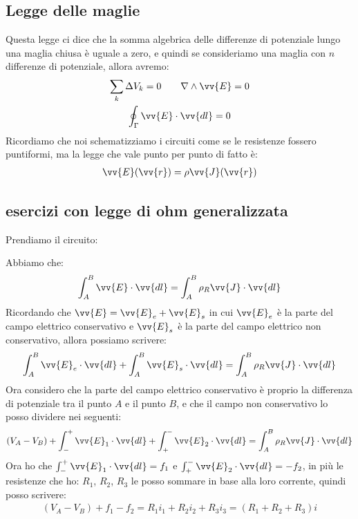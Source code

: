 \documentclass[a4paper, oneside]{article}
\begin{document}
\subsection{Legge delle maglie}
Questa legge ci dice che la somma algebrica delle differenze di potenziale lungo una maglia chiusa è uguale a zero, e quindi se consideriamo una maglia con $n$ differenze di potenziale, allora avremo:
\begin{gather*}
    \sum_k \Delta V_k = 0 \qquad \nabla \land \vv{E} = 0\\
    \oint_\Gamma \vv{E} \cdot \vv{dl} = 0
\end{gather*}
Ricordiamo che noi schematizziamo i circuiti come se le resistenze fossero puntiformi, ma la legge che vale punto per punto di fatto è:
\begin{gather*}
    \vv{E}(\vv{r}) = \rho \vv{J}(\vv{r})
\end{gather*}
\subsection{esercizi con legge di ohm generalizzata}
Prendiamo il circuito:
\begin{center}
\end{center}
Abbiamo che:
\begin{gather*}
    \int_{A}^{B} \vv{E} \cdot \vv{dl} = \int_{A}^{B} \rho_R \vv{J} \cdot \vv{dl}
\end{gather*}
Ricordando che $\vv{E} = \vv{E}_e + \vv{E}_s$ in cui $\vv{E}_e$ è la parte del campo elettrico conservativo e $\vv{E}_s$ è la parte del campo elettrico non conservativo, allora possiamo scrivere:
\begin{gather*}
    \int_{A}^{B} \vv{E}_e \cdot \vv{dl} + \int_{A}^{B} \vv{E}_s \cdot \vv{dl} = \int_{A}^{B} \rho_R \vv{J} \cdot \vv{dl}
\end{gather*}
Ora considero che la parte del campo elettrico conservativo è proprio la differenza di potenziale tra il punto $A$ e il punto $B$, e che il campo non conservativo lo posso dividere nei seguenti:
\begin{gather*}
    (V_A - V_B) +  \int_{-}^{+} \vv{E}_1 \cdot \vv{dl} + \int_{+}^{-} \vv{E}_2 \cdot \vv{dl} = \int_{A}^{B} \rho_R \vv{J} \cdot \vv{dl}
\end{gather*}
Ora ho che $\int_{-}^{+} \vv{E}_1 \cdot \vv{dl} = f_1$ e $\int_{+}^{-} \vv{E}_2 \cdot \vv{dl} = -f_2$, in più le resistenze che ho: $R_1$, $R_2$, $R_3$ le posso sommare in base alla loro corrente, quindi posso scrivere:
\begin{gather*}
    (V_A - V_B) + f_1 - f_2 = R_1 i_1 + R_2 i_2 + R_3 i_3 = (R_1 + R_2 + R_3)i
\end{gather*}
\end{document}
